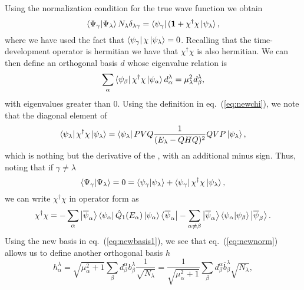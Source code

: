 Using the normalization condition for the true wave function
we obtain
\begin{equation}
  \left\langle \Psi_{\gamma} |\Psi_{\lambda}\right\rangle
  N_{\lambda}\delta_{\lambda\gamma}=
  \left\langle \psi_{\gamma} \right|({\bf 1} +\chi^{\dagger}\chi\left| \psi_{\lambda} \right\rangle,
  \label{eq:newnorm}
\end{equation}
where we have used the fact that
$\left\langle \psi_{\gamma} \right|\chi\left| \psi_{\lambda} \right\rangle=0$. Recalling that the
time-development operator is hermitian we have that $\chi^{\dagger}\chi$ is
also hermitian. We can then define an orthogonal basis $d$ whose eigenvalue
relation is
\begin{equation}
   \sum_{\alpha}\left\langle \psi_{\beta} \right|\chi^{\dagger}
   \chi\left| \psi_{\alpha} \right\rangle d_{\alpha}^{\lambda}=\mu^{2}_{\lambda}
   d_{\beta}^{\lambda},
   \label{eq:newbasis1}
\end{equation}
with eigenvalues greater than $0$.
Using the definition in eq.\ (\ref{eq:newchi}), we note
that the diagonal element of
\begin{equation}
   \left\langle \psi_{\lambda} \right|\chi^{\dagger}
   \chi\left| \psi_{\lambda} \right\rangle=
   \left\langle \psi_{\lambda} \right|PVQ\frac{1}{(E_{\lambda}-QHQ)^2}QVP
   \left| \psi_{\lambda} \right\rangle,
\end{equation}
which is nothing but the derivative of the \qbox, with an additional
minus sign. Thus, noting that if $\gamma\neq\lambda$
\begin{equation}
  \left\langle \Psi_{\gamma} |\Psi_{\lambda}\right\rangle=0=
    \left\langle \psi_{\gamma} |\psi_{\lambda}\right\rangle
   +\left\langle \psi_{\gamma} \right|\chi^{\dagger}\chi\left| \psi_{\lambda} \right\rangle,
\end{equation}  
we can write $\chi^{\dagger}\chi$
in operator form as
\begin{equation}
   \chi^{\dagger}\chi =-\sum_{\alpha}\left| \overline{\psi}_{\alpha} \right\rangle
   \left\langle \psi_{\alpha} \right|\hat{Q}_1(E_{\alpha})\left| \psi_{\alpha} \right\rangle
   \left\langle \overline{\psi}_{\alpha} \right|
   -\sum_{\alpha\neq\beta}\left| \overline{\psi}_{\alpha} \right\rangle
    \left\langle \psi_{\alpha} |\psi_{\beta}\right\rangle
   \left| \overline{\psi}_{\beta} \right\rangle.
\end{equation}
Using the new basis in eq.\ (\ref{eq:newbasis1}), we see that
eq.\ (\ref{eq:newnorm}) allows us to define another
orthogonal basis $h$
\begin{equation}
  h_{\alpha}^{\lambda}=\sqrt{\mu_{\alpha}^2+1}\sum_{\beta}
  d_{\beta}^{\alpha}b_{\beta}^{\lambda}\frac{1}{\sqrt{N_{\lambda}}}
  =\frac{1}{\sqrt{\mu_{\alpha}^2+1}}\sum_{\beta}
  d_{\beta}^{\alpha}\overline{b}_{\beta}^{\lambda}\sqrt{N_{\lambda}},
\end{equation}
